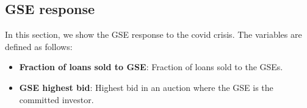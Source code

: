 \documentclass[11pt,a4paper]{article}
\begin{document}
\pagebreak
\subsection{GSE response }

 In this section, we show the GSE response to the covid crisis. The variables are defined as follows:
\begin{itemize}
\item \textbf{Fraction of loans sold to GSE}: Fraction of loans sold to the GSEs.
\item \textbf{GSE highest bid}: Highest bid in an auction where the GSE is the committed investor.
\end{itemize}
\end{document}
